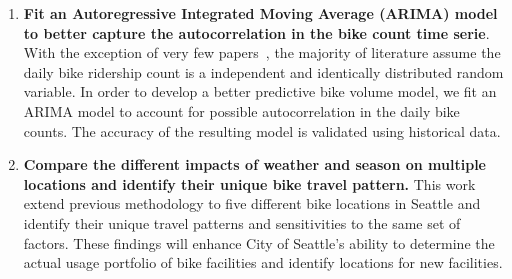 \documentclass [11pt, proquest] {uwthesis}[2015/03/03]
\begin{document}
\begin{enumerate}
\item \textbf{Fit an Autoregressive Integrated Moving Average (ARIMA) model to better capture the autocorrelation in the bike count time serie}. With the exception of very few papers~\cite{Gallop:2012aa,Nosal:2014aa}, the majority of literature assume the daily bike ridership count is a independent and identically distributed random variable. In order to develop a better predictive bike volume model, we fit an ARIMA model to account for possible autocorrelation in the daily bike counts. The accuracy of the resulting model is validated using historical data.

\item \textbf{Compare the different impacts of weather and season on multiple locations and identify their unique bike travel pattern.} This work extend previous methodology to five different bike locations in Seattle and identify their unique travel patterns and sensitivities to the same set of factors. These findings will enhance City of Seattle's ability to determine the actual usage portfolio of bike facilities and identify locations for new facilities.




\end{enumerate}
 
\end{document}

